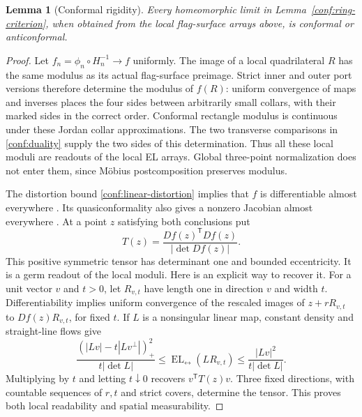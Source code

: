 \documentclass[11pt]{article}
\numberwithin{equation}{section}
\newtheorem{lemma}[theorem]{Lemma}
\theoremstyle{definition}
\theoremstyle{remark}
\newcommand{\1}{\mathbf 1}
\begin{document}
\begin{lemma}[Conformal rigidity]
\label{conf:tensor}
Every homeomorphic limit in Lemma~\ref{conf:ring-criterion}, when
obtained from the local flag-surface arrays above, is conformal or
anticonformal.
\end{lemma}

\begin{proof}
Let \(f_n=\phi_n\circ H_n^{-1}\to f\) uniformly.  The image
of a local quadrilateral \(R\) has the same modulus as its actual
flag-surface preimage.  Strict inner and outer port versions
therefore determine the modulus of \(f(R)\): uniform convergence
of maps and inverses places the four sides between arbitrarily
small collars, with their marked sides in the correct order.
Conformal rectangle modulus is continuous under these Jordan
collar approximations.  The two transverse comparisons in
\eqref{conf:duality} supply the two sides of this determination.
Thus all these local moduli are readouts of the local EL arrays.
Global three-point normalization does not enter them, since
M\"obius postcomposition preserves modulus.

The distortion bound \eqref{conf:linear-distortion} implies that
\(f\) is differentiable almost everywhere
\cite[Lemma~2]{Cristea1989Quasiconformality}.  Its quasiconformality
also gives a nonzero Jacobian almost everywhere
\cite[Theorem~3.1.2]{AstalaIwaniecMartin2009}.
At a point \(z\) satisfying both conclusions put
\begin{equation}
 T(z)=\frac{Df(z)^{\mathsf T}Df(z)}{|\det Df(z)|}.
 \label{conf:tensor-definition}
\end{equation}
This positive symmetric tensor has determinant one and bounded
eccentricity.  It is a germ readout of the local moduli.  Here is
an explicit way to recover it.  For a unit vector \(v\) and
\(t>0\), let \(R_{v,t}\) have length one in direction \(v\)
and width \(t\).  Differentiability implies uniform convergence
of the rescaled images of \(z+rR_{v,t}\) to
\(Df(z)R_{v,t}\), for fixed \(t\).  If \(L\) is a nonsingular
linear map, constant density and straight-line flows give
\[
 \frac{(|Lv|-t|Lv^\perp|)_+^2}{t|\det L|}
 \le \operatorname{EL}_{\leftrightarrow}(LR_{v,t})
 \le \frac{|Lv|^2}{t|\det L|}.
\]
Multiplying by \(t\) and letting \(t\downarrow0\) recovers
\(v^{\mathsf T}T(z)v\).  Three fixed directions, with countable
sequences of \(r,t\) and strict covers, determine the tensor.
This proves both local readability and spatial measurability.


\end{proof}
\end{document}
